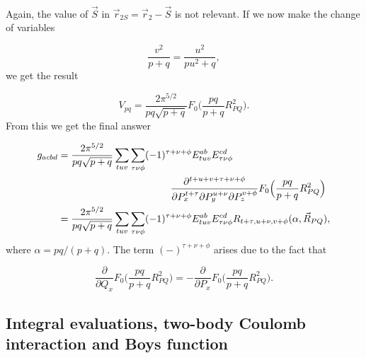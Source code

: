 \documentclass[%
twoside,                 %
final,                   %
10pt]{article}
\begin{document}
\paragraph{}

Again, the value of $\vec S$ in $\vec r_{2S} = \vec r_2 - \vec S$ is not relevant. If we now make the change of variables

\begin{equation}
 \frac{v^2}{p+q} = \frac{u^2}{pu^2+q},
\end{equation}
we get the result

\begin{equation}
 V_{pq} = \frac{2\pi^{5/2}}{pq\sqrt{p+q}}F_0\Big(\frac{pq}{p+q}R^2_{PQ}\Big).
\end{equation}
From this we get the final answer

\begin{equation}
\begin{split}
 g_{acbd} & = \frac{2\pi^{5/2}}{pq\sqrt{p+q}}\sum_{tuv}\sum_{\tau\nu\phi}(-1)^{\tau+\nu+\phi}E^{ab}_{tuv}E^{cd}_{\tau\nu\phi} \\
          & \hspace{40mm} \frac{\partial^{t+u+v+\tau+\nu+\phi}}{\partial P_x^{t+\tau} \partial P_y^{u+\nu} \partial P_z^{v+\phi}}F_0\Big(\frac{pq}{p+q}R^2_{PQ}\Big) \\
          & = \frac{2\pi^{5/2}}{pq\sqrt{p+q}}\sum_{tuv}\sum_{\tau\nu\phi}(-1)^{\tau+\nu+\phi}E^{ab}_{tuv}E^{cd}_{\tau\nu\phi}R_{t+\tau,u+\nu,v+\phi}(\alpha,\vec R_{PQ}),
\end{split}
\end{equation}
where $\alpha = pq/(p+q)$. The term $(-)^{\tau+\nu+\phi}$ arises due to the fact that

\begin{equation}
\frac{\partial}{\partial Q_x} F_0\Big(\frac{pq}{p+q}R^2_{PQ}\Big) = - \frac{\partial}{\partial P_x} F_0\Big(\frac{pq}{p+q}R^2_{PQ}\Big).
\end{equation}



\subsection{Integral evaluations, two-body Coulomb interaction and Boys function}

\paragraph{}
\end{document}
